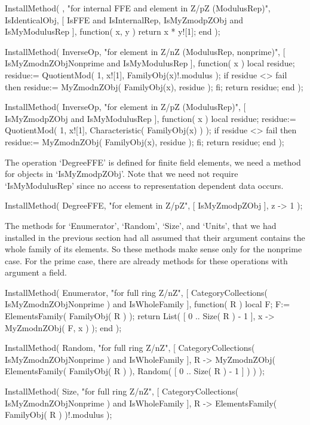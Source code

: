 InstallMethod( \*,
    "for internal FFE and element in Z/pZ (ModulusRep)",
    IsIdenticalObj,
    [ IsFFE and IsInternalRep, IsMyZmodpZObj and IsMyModulusRep ],
    function( x, y ) return x * y![1]; end );

InstallMethod( InverseOp,
    "for element in Z/nZ (ModulusRep, nonprime)",
    [ IsMyZmodnZObjNonprime and IsMyModulusRep ],
    function( x )
    local residue;
    residue:= QuotientMod( 1, x![1], FamilyObj(x)!.modulus );
    if residue <> fail then
      residue:= MyZmodnZObj( FamilyObj(x), residue );
    fi;
    return residue;
    end );

InstallMethod( InverseOp,
    "for element in Z/pZ (ModulusRep)",
    [ IsMyZmodpZObj and IsMyModulusRep ],
    function( x )
    local residue;
    residue:= QuotientMod( 1, x![1], Characteristic( FamilyObj(x) ) );
    if residue <> fail then
      residue:= MyZmodnZObj( FamilyObj(x), residue );
    fi;
    return residue;
    end );
\endtt

The operation `DegreeFFE' is defined for finite field elements,
we need a method for objects in `IsMyZmodpZObj'.
Note that we need not require `IsMyModulusRep' since no access to
representation dependent data occurs.

\begintt
InstallMethod( DegreeFFE,
    "for element in Z/pZ",
    [ IsMyZmodpZObj ],
    z -> 1 );
\endtt

The methods for `Enumerator', `Random', `Size', and `Units',
that we had installed in the previous section had all assumed that
their argument contains the whole family of its elements.
So these methods make sense only for the nonprime case.
For the prime case, there are already methods for these operations
with argument a field.

\begintt
InstallMethod( Enumerator,
    "for full ring Z/nZ",
    [ CategoryCollections( IsMyZmodnZObjNonprime ) and IsWholeFamily ],
    function( R )
    local F;
    F:= ElementsFamily( FamilyObj( R ) );
    return List( [ 0 .. Size( R ) - 1 ], x -> MyZmodnZObj( F, x ) );
    end );

InstallMethod( Random,
    "for full ring Z/nZ",
    [ CategoryCollections( IsMyZmodnZObjNonprime ) and IsWholeFamily ],
    R -> MyZmodnZObj( ElementsFamily( FamilyObj( R ) ),
                    Random( [ 0 .. Size( R ) - 1 ] ) ) );

InstallMethod( Size,
    "for full ring Z/nZ",
    [ CategoryCollections( IsMyZmodnZObjNonprime ) and IsWholeFamily ],
    R -> ElementsFamily( FamilyObj( R ) )!.modulus );

